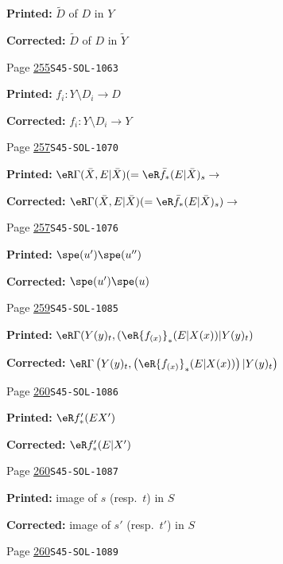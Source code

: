 \begin{description}
\par\noindent\textbf{Printed:} $\widetilde D$ of $D$ in $Y$
\par\noindent\textbf{Corrected:} $\widetilde D$ of $D$ in $\widetilde Y$
\smallskip
\item[\hypertarget{apparatus:EN-0182}{182}] Page \hyperlink{printpage:en:255}{255}\quad\texttt{S45-SOL-1063}
\par\noindent\textbf{Printed:} \(f_i:Y\setminus D_i \to D\)
\par\noindent\textbf{Corrected:} \(f_i:Y\setminus D_i \to Y\)
\smallskip
\item[\hypertarget{apparatus:EN-0183}{183}] Page \hyperlink{printpage:en:257}{257}\quad\texttt{S45-SOL-1070}
\par\noindent\textbf{Printed:} \(\eR\Gamma(\bar X,E|\bar X) (=\eR\bar f_\ast (E|\bar X)_s \to\)
\par\noindent\textbf{Corrected:} \(\eR\Gamma(\bar X,E|\bar X) (=\eR\bar f_\ast (E|\bar X)_s) \to\)
\smallskip
\item[\hypertarget{apparatus:EN-0184}{184}] Page \hyperlink{printpage:en:257}{257}\quad\texttt{S45-SOL-1076}
\par\noindent\textbf{Printed:} \(\spe(u')\spe(u'')\)
\par\noindent\textbf{Corrected:} \(\spe(u')\spe(u)\)
\smallskip
\item[\hypertarget{apparatus:EN-0185}{185}] Page \hyperlink{printpage:en:259}{259}\quad\texttt{S45-SOL-1085}
\par\noindent\textbf{Printed:} \(\eR\Gamma(Y(y)_t,(\eR {f_{(x)}}_\ast (E|X(x))|Y(y)_t)\)
\par\noindent\textbf{Corrected:} \(\eR\Gamma\left(Y(y)_t,\left(\eR {f_{(x)}}_\ast (E|X(x))\right)|Y(y)_t\right)\)
\smallskip
\item[\hypertarget{apparatus:EN-0186}{186}] Page \hyperlink{printpage:en:260}{260}\quad\texttt{S45-SOL-1086}
\par\noindent\textbf{Printed:} \(\eR f'_\ast(E X')\)
\par\noindent\textbf{Corrected:} \(\eR f'_\ast(E|X')\)
\smallskip
\item[\hypertarget{apparatus:EN-0187}{187}] Page \hyperlink{printpage:en:260}{260}\quad\texttt{S45-SOL-1087}
\par\noindent\textbf{Printed:} image of
$s$ (resp.\ $t$) in $S$
\par\noindent\textbf{Corrected:} image of
$s'$ (resp.\ $t'$) in $S$
\smallskip
\item[\hypertarget{apparatus:EN-0188}{188}] Page \hyperlink{printpage:en:260}{260}\quad\texttt{S45-SOL-1089}

\end{description}
